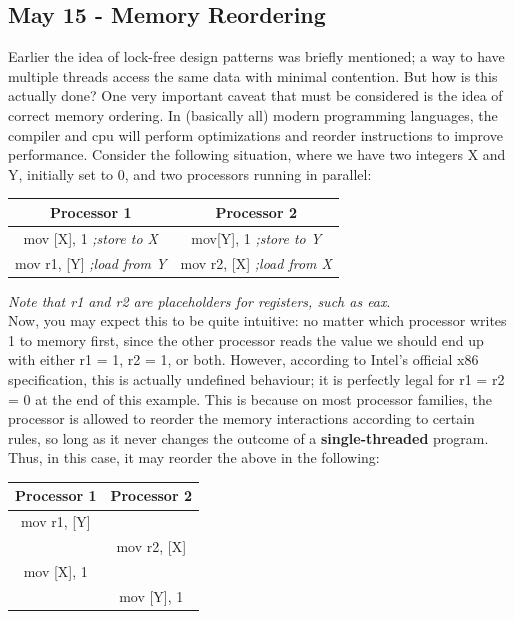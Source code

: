 \documentclass[11pt, a4paper]{article}
\theoremstyle{definition}
\theoremstyle{remark}
\begin{document}
\subsection{May 15 - Memory Reordering}
Earlier the idea of lock-free design patterns was briefly mentioned; a way to have multiple threads access the same data with minimal contention. But how is this actually done? One very important caveat that must be considered is the idea of correct memory ordering.
In (basically all) modern programming languages, the compiler and cpu will perform optimizations and reorder instructions to improve performance. Consider the following situation, where we have two integers X and Y, initially set to 0, and two processors running in parallel:
\begin{center}
\begin{tabular}{|c | c|}
  \hline
  Processor 1 & Processor 2 \\
  \hline
  mov [X], 1 \textit{;store to X}  & mov[Y], 1 \textit{;store to Y}\\
  mov r1, [Y] \textit{;load from Y}& mov r2, [X] \textit{;load from X} \\
  \hline
\end{tabular}
\end{center}
\textit{Note that r1 and r2 are placeholders for registers, such as eax}.\\
Now, you may expect this to be quite intuitive: no matter which processor writes 1 to memory first, since the other processor reads the value we should end up with either r1 = 1, r2 = 1, or both.
However, according to Intel's official x86 specification, this is actually undefined behaviour; it is perfectly legal for r1 = r2 = 0 at the end of this example. This is because on most processor families, the processor is allowed to reorder the memory interactions according to certain rules,
so long as it never changes the outcome of a \textbf{single-threaded} program. Thus, in this case, it may reorder the above in the following:
\begin{center}
\begin{tabular}{|c | c|}
  \hline
  Processor 1 & Processor 2 \\
  \hline
  mov r1, [Y] &  \\
              & mov r2, [X] \\
  mov [X], 1  &  \\
              & mov [Y], 1  \\
  \hline
\end{tabular}
\end{center}
\end{document}

